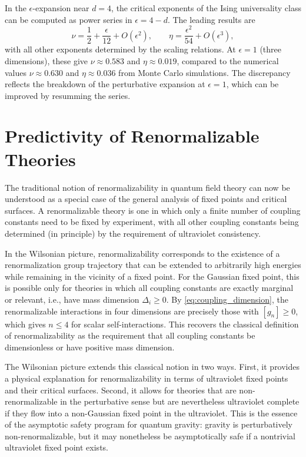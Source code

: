 \documentclass[11pt, twoside, openright]{book}
\theoremstyle{dotted}
\theoremstyle{definition}
\begin{document}
In the $\epsilon$-expansion near $d = 4$, the critical exponents of the Ising
universality class can be computed as power series in $\epsilon = 4 - d$. The
leading results are
\begin{equation}
  \nu = \frac{1}{2} + \frac{\epsilon}{12} + O(\epsilon^2), \qquad
  \eta = \frac{\epsilon^2}{54} + O(\epsilon^3),
  \label{eq:epsilon_exponents}
\end{equation}
with all other exponents determined by the scaling relations. At $\epsilon = 1$
(three dimensions), these give $\nu \approx 0.583$ and $\eta \approx 0.019$,
compared to the numerical values $\nu \approx 0.630$ and $\eta \approx 0.036$ from
Monte Carlo simulations. The discrepancy reflects the breakdown of the perturbative
expansion at $\epsilon = 1$, which can be improved by resumming the series.

\section{Predictivity of Renormalizable Theories}

The traditional notion of renormalizability in quantum field theory can now be
understood as a special case of the general analysis of fixed points and critical
surfaces. A renormalizable theory is one in which only a finite number of coupling
constants need to be fixed by experiment, with all other coupling constants being
determined (in principle) by the requirement of ultraviolet consistency.

In the Wilsonian picture, renormalizability corresponds to the existence of a
renormalization group trajectory that can be extended to arbitrarily high energies
while remaining in the vicinity of a fixed point. For the Gaussian fixed point,
this is possible only for theories in which all coupling constants are exactly
marginal or relevant, i.e., have mass dimension $\Delta_i \geq 0$. By
\eqref{eq:coupling_dimension}, the renormalizable interactions in four dimensions
are precisely those with $[g_n] \geq 0$, which gives $n \leq 4$ for scalar
self-interactions. This recovers the classical definition of renormalizability
as the requirement that all coupling constants be dimensionless or have positive
mass dimension.

The Wilsonian picture extends this classical notion in two ways. First, it provides
a physical explanation for renormalizability in terms of ultraviolet fixed points
and their critical surfaces. Second, it allows for theories that are non-renormalizable
in the perturbative sense but are nevertheless ultraviolet complete if they flow
into a non-Gaussian fixed point in the ultraviolet. This is the essence of the
asymptotic safety program for quantum gravity: gravity is perturbatively
non-renormalizable, but it may nonetheless be asymptotically safe if a nontrivial
ultraviolet fixed point exists.
\end{document}

